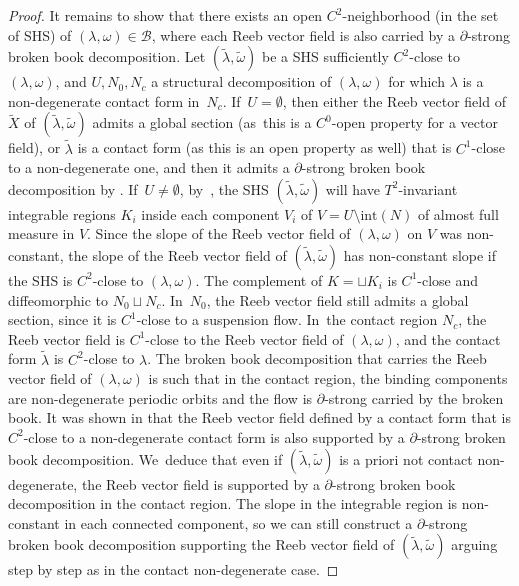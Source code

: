 \documentclass[JEP,XML,SOM,Unicode,NoEqCountersInSection,NoFloatCountersInSection,published]{cedram}
\theoremstyle{definition}
\begin{document}
\begin{proof}
It remains to show that there exists an open $C^2$-neighborhood (in the set of SHS) of $(\lambda,\omega)\in \mathcal{B}$, where each Reeb vector field is also carried by a $\partial$-strong broken book decomposition. Let $(\widetilde \lambda, \widetilde \omega)$ be a SHS sufficiently $C^2$-close to $(\lambda,\omega)$, and $U, N_0, N_c$ a structural decomposition of $(\lambda,\omega)$ for which $\lambda$ is a non-degenerate contact form in~$N_c$. If~$U=\emptyset$, then either the Reeb vector field of $\widetilde X$ of $(\widetilde \lambda, \widetilde \omega)$ admits a global section (as~this is a $C^0$-open property for a vector field), or $\widetilde \lambda$ is a contact form (as this is an open property as well) that is $C^1$-close to a non-degenerate one, and then it admits a $\partial$-strong broken book decomposition by \cite[Th.\,1.1]{CDR}. If~$U\neq \emptyset$, by~\cite[Th.\,3.7]{CV1}, the SHS $(\widetilde \lambda, \widetilde \omega)$ will have $T^2$-invariant integrable regions $K_i$ inside each component $V_i$ of $V=U\setminus \text{int}(N)$ of almost full measure in $V$. Since the slope of the Reeb vector field of $(\lambda,\omega)$ on $V$ was non-constant, the slope of the Reeb vector field of $(\widetilde \lambda, \widetilde \omega)$ has non-constant slope if the SHS is $C^2$-close to $(\lambda,\omega)$. The complement of $K=\sqcup K_i$ is $C^1$-close and diffeomorphic to $N_0\sqcup N_c$. In~$N_0$, the Reeb vector field still admits a global section, since it is $C^1$-close to a suspension flow. In~the contact region $N_c$, the Reeb vector field is $C^1$-close to the Reeb vector field of $(\lambda, \omega)$, and the contact form $\widetilde \lambda$ is $C^2$-close to $\lambda$. The broken book decomposition that carries the Reeb vector field of $(\lambda,\omega)$ is such that in the contact region, the binding components are non-degenerate periodic orbits and the flow is $\partial$-strong carried by the broken book. It was shown in \cite[\S 4.7]{CDR} that the Reeb vector field defined by a contact form that is $C^2$-close to a non-degenerate contact form is also supported by a $\partial$-strong broken book decomposition. We~deduce that even if
$(\widetilde \lambda, \widetilde \omega)$ is a priori not contact non-degenerate, the Reeb vector field is supported by a $\partial$-strong broken book decomposition in the contact region.
The slope in the integrable region is non-constant in each connected component, so we can still construct a $\partial$-strong broken book decomposition supporting the Reeb vector field of $(\widetilde \lambda, \widetilde \omega)$ arguing step by step as in the contact non-degenerate case.
\end{proof}
\end{document}
